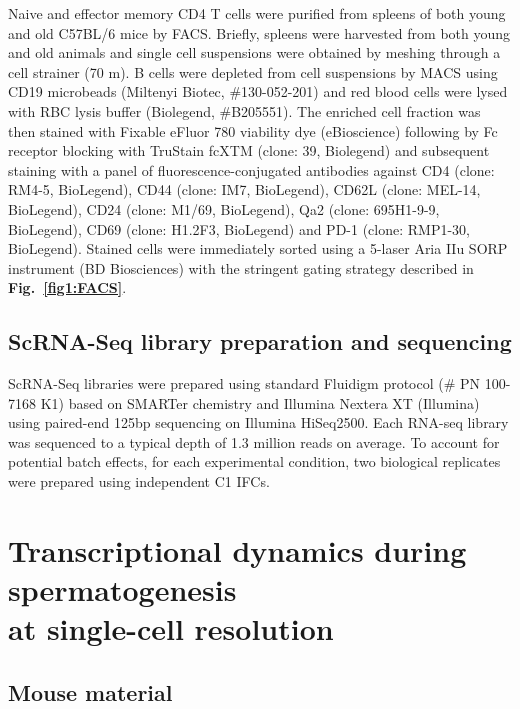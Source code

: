 Naive and effector memory CD4\plus{} T cells were purified from spleens of both young and old C57BL/6 mice by FACS.  Briefly, spleens were harvested from both young and old animals and single cell suspensions were obtained by meshing through a cell strainer (70 \textmu{}m). B cells were depleted from cell suspensions by MACS using CD19 microbeads (Miltenyi Biotec, \#{}130-052-201) and red blood cells were lysed with RBC lysis buffer (Biolegend, \#{}B205551). The enriched cell fraction was then stained with Fixable eFluor 780 viability dye (eBioscience) following by Fc receptor blocking with TruStain fcXTM (clone: 39, Biolegend) and subsequent staining with a panel of fluorescence-conjugated antibodies against CD4 (clone: RM4-5, BioLegend), CD44 (clone: IM7, BioLegend), CD62L (clone: MEL-14, BioLegend), CD24 (clone: M1/69, BioLegend), Qa2 (clone: 695H1-9-9, BioLegend), CD69 (clone: H1.2F3, BioLegend) and PD-1 (clone: RMP1-30, BioLegend).  Stained cells were immediately sorted using a 5-laser Aria IIu SORP instrument (BD Biosciences) with the stringent gating strategy described in \textbf{Fig.~\ref{fig1:FACS}}. 

\subsection{ScRNA-Seq library preparation and sequencing}
\label{appA.1:RNA-Seq}

ScRNA-Seq libraries were prepared using standard Fluidigm protocol (\# PN 100-7168 K1) based on SMARTer chemistry and Illumina Nextera XT (Illumina) using paired-end 125bp sequencing on Illumina HiSeq2500. Each RNA-seq library was sequenced to a typical depth of 1.3 million reads on average. To account for potential batch effects, for each experimental condition, two biological replicates were prepared using independent C1 IFCs.

\newpage

\section{Transcriptional dynamics during spermatogenesis \\ at single-cell resolution}
\label{appA.2}

\subsection{Mouse material}


